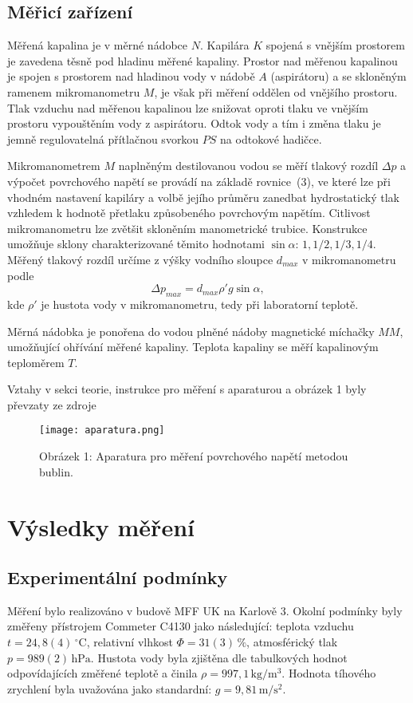 \documentclass{prepareprotokol} %
\begin{document}
\subsection*{Měřicí zařízení}

Měřená kapalina je v měrné nádobce $N$. Kapilára $K$ spojená s vnějším prostorem je zavedena těsně pod hladinu měřené kapaliny. Prostor nad měřenou kapalinou je spojen s prostorem nad hladinou vody v nádobě $A$ (aspirátoru) a se skloněným ramenem mikromanometru $M$, je však při měření oddělen od vnějšího prostoru. Tlak vzduchu nad měřenou kapalinou lze snižovat oproti tlaku ve vnějším prostoru vypouštěním vody z aspirátoru. Odtok vody a tím i změna tlaku je jemně regulovatelná přítlačnou svorkou $PS$ na odtokové hadičce.

Mikromanometrem $M$ naplněným destilovanou vodou se měří tlakový rozdíl $\Delta p$ a výpočet povrchového napětí se provádí na základě rovnice~(3), ve které lze při vhodném nastavení kapiláry a volbě jejího průměru zanedbat hydrostatický tlak vzhledem k hodnotě přetlaku způsobeného povrchovým napětím. Citlivost mikromanometru lze zvětšit skloněním manometrické trubice. Konstrukce umožňuje sklony charakterizované těmito hodnotami $\sin\alpha$: $1, 1/2, 1/3, 1/4$. Měřený tlakový rozdíl určíme z výšky vodního sloupce $d_{max}$ v mikromanometru podle
\begin{equation}
\Delta p_{max} = d_{max} \rho' g \sin\alpha,
\end{equation}
kde $\rho'$ je hustota vody v mikromanometru, tedy při laboratorní teplotě.

Měrná nádobka je ponořena do vodou plněné nádoby magnetické míchačky $MM$, umožňující ohřívání měřené kapaliny. Teplota kapaliny se měří kapalinovým teploměrem $T$.

Vztahy v sekci teorie, instrukce pro měření s aparaturou a obrázek 1 byly převzaty ze zdroje

\begin{figure}[h!]
    \centering
    \texttt{[image: aparatura.png]}
    \caption{Obrázek 1: Aparatura pro měření povrchového napětí metodou bublin.}
    \label{fig:aparatura}
\end{figure}
\vspace{100px}

\section{Výsledky měření}

\subsection{Experimentální podmínky}
Měření bylo realizováno v budově MFF UK na Karlově 3. Okolní podmínky byly změřeny přístrojem Commeter C4130 jako následující: teplota vzduchu $t = 24{,}8(4)\,^\circ\mathrm{C}$, relativní vlhkost $\Phi = 31(3)\,\%$, atmosférický tlak $p = 989(2)\,\mathrm{hPa}$. Hustota vody byla zjištěna dle tabulkových hodnot odpovídajících změřené teplotě a činila $\rho = 997{,}1\,\mathrm{kg/m^3}$. Hodnota tíhového zrychlení byla uvažována jako standardní: $g = 9{,}81\,\mathrm{m/s^2}$.
\end{document}
